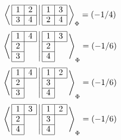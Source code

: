 \documentclass[fleqn]{article}%
\newcommand{\checkpagebreak}{\needspace{.25\textheight}}%
\begin{document}
%
\begin{dmath*}\bra{\,\begin{array}{|c|c|} \hline 1 & 2\\ \cline{1-2} 3 & 4\\ \cline{1-2} \end{array} \,} \ket{\,\begin{array}{|c|c|} \hline 1 & 3\\ \cline{1-2} 2 & 4\\ \cline{1-2} \end{array} \,}_{\Phi} = \left( - 1/4\right) \end{dmath*}%
\vspace{0.25cm}%
\begin{dmath*}\bra{\,\begin{array}{|c|c|} \hline 1 & 4\\ \cline{1-2} 2\\ \cline{1-1} 3\\ \cline{1-1} \end{array} \,} \ket{\,\begin{array}{|c|c|} \hline 1 & 3\\ \cline{1-2} 2\\ \cline{1-1} 4\\ \cline{1-1} \end{array} \,}_{\Phi} = \left( - 1/6\right) \end{dmath*}%
\vspace{0.25cm}%
\begin{dmath*}\bra{\,\begin{array}{|c|c|} \hline 1 & 4\\ \cline{1-2} 2\\ \cline{1-1} 3\\ \cline{1-1} \end{array} \,} \ket{\,\begin{array}{|c|c|} \hline 1 & 2\\ \cline{1-2} 3\\ \cline{1-1} 4\\ \cline{1-1} \end{array} \,}_{\Phi} = \left( - 1/6\right) \end{dmath*}%
\vspace{0.25cm}%
\begin{dmath*}\bra{\,\begin{array}{|c|c|} \hline 1 & 3\\ \cline{1-2} 2\\ \cline{1-1} 4\\ \cline{1-1} \end{array} \,} \ket{\,\begin{array}{|c|c|} \hline 1 & 2\\ \cline{1-2} 3\\ \cline{1-1} 4\\ \cline{1-1} \end{array} \,}_{\Phi} = \left( - 1/6\right) \end{dmath*}%
\vspace{0.25cm}%
\checkpagebreak%
\end{document}
